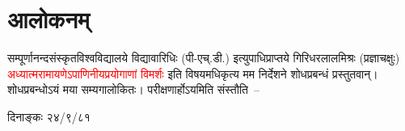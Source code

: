 %
%
%

\renewcommand\chaptername{}
\chapter[आलोकनम्]{आलोकनम्}
\fontsize{14}{19}\selectfont
\begin{sloppypar}\justifying\noindent\hspace{10mm} सम्पूर्णानन्दसंस्कृतविश्वविद्यालये विद्यावारिधिः (पी-एच्.डी.) इत्युपाधिप्राप्तये गिरिधरलालमिश्रः (प्रज्ञाचक्षुः) \textcolor{red}{अध्यात्मरामायणेऽपाणिनीयप्रयोगाणां विमर्शः} इति विषयमधिकृत्य मम निर्देशने शोधप्रबन्धं प्रस्तुतवान्। शोधप्रबन्धोऽयं मया सम्यगालोकितः। परीक्षणार्होऽयमिति संस्तौति~– \end{sloppypar}
\vspace{4mm}
\raggedright{दिनाङ्कः २४/९/८१}\\
\vspace{4mm}

